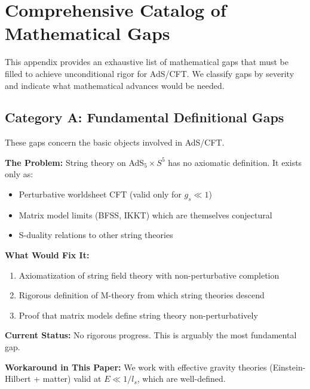 \documentclass[12pt,a4paper]{article}
\begin{document}
\appendix
\section{Comprehensive Catalog of Mathematical Gaps}
\label{app:math-gaps}

This appendix provides an exhaustive list of mathematical gaps that must be filled to achieve unconditional rigor for AdS/CFT. We classify gaps by severity and indicate what mathematical advances would be needed.

\subsection{Category A: Fundamental Definitional Gaps}

These gaps concern the basic objects involved in AdS/CFT.

\begin{gapbox}[title={Gap A1: Non-Perturbative Definition of String Theory}]
\textbf{The Problem:} String theory on AdS$_5 \times S^5$ has no axiomatic definition. It exists only as:
\begin{itemize}
    \item Perturbative worldsheet CFT (valid only for $g_s \ll 1$)
    \item Matrix model limits (BFSS, IKKT) which are themselves conjectural
    \item S-duality relations to other string theories
\end{itemize}

\textbf{What Would Fix It:}
\begin{enumerate}
    \item Axiomatization of string field theory with non-perturbative completion
    \item Rigorous definition of M-theory from which string theories descend
    \item Proof that matrix models define string theory non-perturbatively
\end{enumerate}

\textbf{Current Status:} No rigorous progress. This is arguably the most fundamental gap.

\textbf{Workaround in This Paper:} We work with effective gravity theories (Einstein-Hilbert + matter) valid at $E \ll 1/l_s$, which are well-defined.
\end{gapbox}
\end{document}
